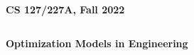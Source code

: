 \documentclass[12pt,letterpaper]{scrartcl}
\begin{document}
\thispagestyle{empty}
$ $
\vfill
\begin{center}
\centerline{\huge \textbf{CS 127/227A, Fall 2022}}
\[
\]
\centerline{\huge \textbf{Optimization Models in Engineering}}
\[
\]
\centerline{\huge {}}
\centerline{\huge {}} 
\end{center}
\vfill
$ $
\newpage
\tableofcontents
\newpage
\renewcommand\thesubsection{\thesection.\alph{subsection}}
\renewcommand\thesubsubsection{\thesection.\roman{subsubsection}}
 \vfill
%  
\end{document}
